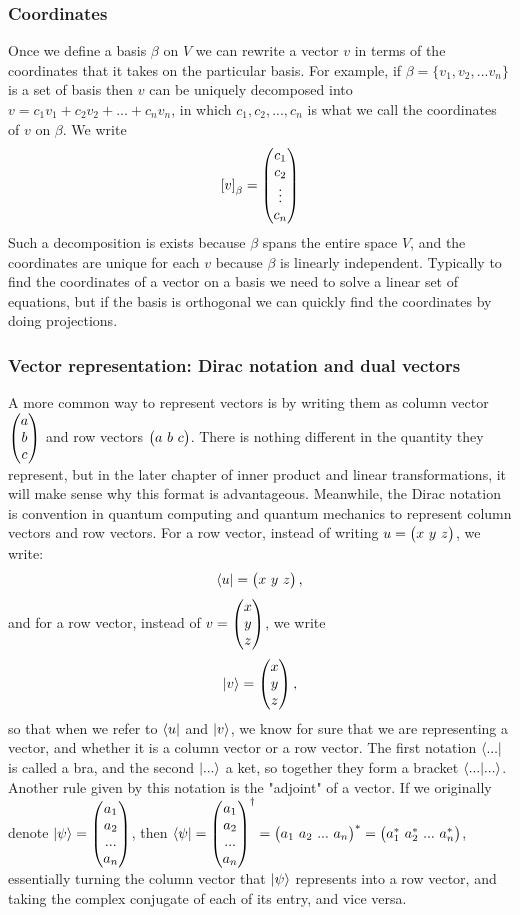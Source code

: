 \documentclass[12pt]{article}
\begin{document}
\subsubsection{Coordinates}
Once we define a basis $\beta$ on $V$ we can rewrite a vector $v$ in terms of the coordinates that it takes on the particular basis. For example, if $\beta=\{v_1, v_2,...v_n\}$ is a set of basis then $v$ can be uniquely decomposed into $v=c_1v_1+c_2v_2+...+c_nv_n$, in which $c_1, c_2,..., c_n$ is what we call the coordinates of $v$ on $\beta$. We write $$\left[v\right]_\beta=\pmqty{c_1\\c_2\\ \vdots \\c_n}$$ Such a decomposition is exists because $\beta$ spans the entire space $V$, and the coordinates are unique for each $v$ because $\beta$
is linearly independent. Typically to find the coordinates of a vector on a basis we need to solve a linear set of equations, but if the basis is orthogonal we can quickly find the coordinates by doing projections.
\subsubsection{Vector representation: Dirac notation and dual vectors}
A more common way to represent vectors is by writing them as column vector $\pmqty{a\\b\\c}$ and row vectors $\pmqty{a\ b\ c}$. There is nothing different in the quantity they represent, but in the later chapter of inner product and linear transformations, it will make sense why this format is advantageous. Meanwhile, the Dirac notation is convention in quantum computing and quantum mechanics to represent column vectors and row vectors. 
For a row vector, instead of writing $u=\pmqty{x\ y\ z}$, we write:
$$\bra{u}=\pmqty{x\ y\ z},$$ and for a row vector, instead of $v=\pmqty{x\\y\\z}$, we write $$\ket{v}=\pmqty{x\\y\\z},$$ so that when we refer to $\bra{u}$ and $\ket{v}$, we know for sure that we are representing a vector, and whether it is a column vector or a row vector. The first notation $\bra{...}$ is called a bra, and the second $\ket{...}$ a ket, so together they form a bracket $\braket{...}$.\\
Another rule given by this notation is the "adjoint" of a vector. If we originally denote $\ket{\psi} = \pmqty{a_1\\a_2\\...\\a_n}$, then $\bra{\psi}=\pmqty{a_1\\a_2\\...\\a_n}^\dagger=\pmqty{a_1\ a_2\ ...\ a_n}^*=\pmqty{a_1^*\ a_2^*\ ...\ a_n^*}$, essentially turning the column vector that $\ket{\psi}$ represents into a row vector, and taking the complex conjugate of each of its entry, and vice versa.\\
\end{document}
